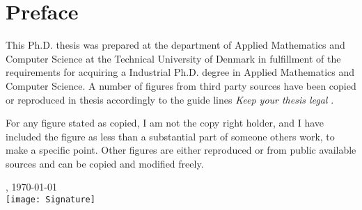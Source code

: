 \chapter{Preface}
This Ph.D. thesis was prepared at the department of Applied Mathematics and Computer Science at the Technical University of Denmark in fulfillment of the requirements for acquiring a Industrial Ph.D. degree in Applied Mathematics and Computer Science.
A number of figures from third party sources have been copied or reproduced in thesis accordingly to the guide lines \textit{Keep your thesis legal} \cite{johnson2015keeping}.

For any figure stated as copied, I am not the copy right holder, and I have included the figure as less than a substantial part of someone others work, to make a specific point. Other figures are either reproduced or from public available sources and can be copied and modified freely.

\vfill

{
\centering
    \thesislocation{}, \today\\[1cm]
    \hspace{3cm}\texttt{[image: Signature]}\\[1cm]
\begin{flushright}
    \thesisauthor{}
\end{flushright}
}